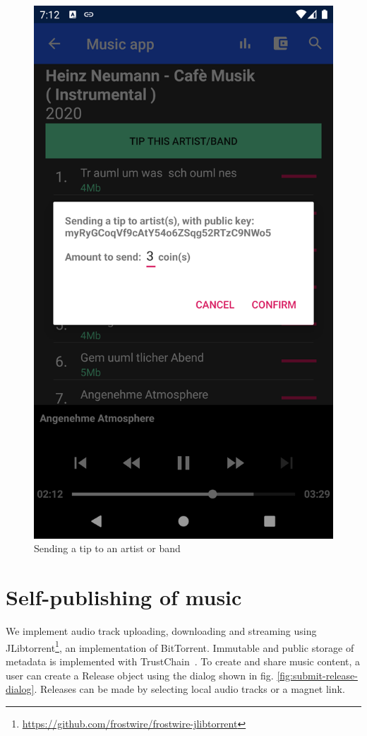 \begin{figure}
        \includegraphics[width=1\linewidth]{implementation/send-tip.png}
        \caption{Sending a tip to an artist or band}
        \label{fig:tip-artist}
    \endminipage\hfill
\end{figure}

\section{Self-publishing of music}
We implement audio track uploading, downloading and streaming using JLibtorrent\footnote{\url{https://github.com/frostwire/frostwire-jlibtorrent}}, an implementation of BitTorrent. Immutable and public storage of metadata is implemented with TrustChain~\citep{otte2017trustchain}. 
\label{sec:torrent-creation}
To create and share music content, a user can create a Release object using the dialog shown in fig. \ref{fig:submit-release-dialog}. Releases can be made by selecting local audio tracks or a magnet link. 

